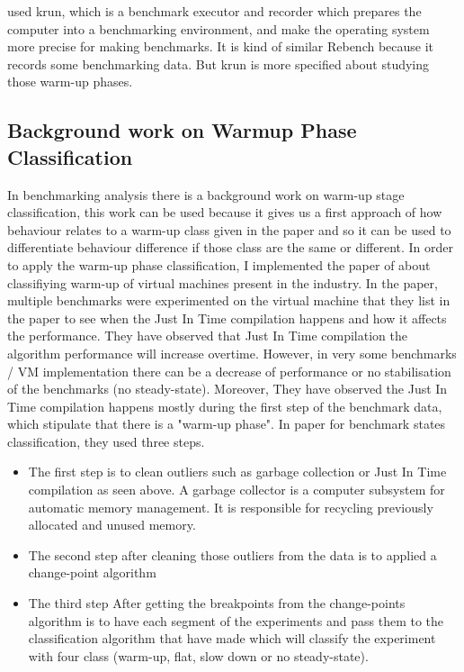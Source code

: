 \documentclass{article}
\begin{document}
\citep{barrett2017virtual} used krun, which is a benchmark executor and recorder which prepares the computer into a benchmarking environment, and make the operating system more precise for making benchmarks. It is kind of similar Rebench because it records some benchmarking data. But krun is more specified about studying those warm-up phases.

\subsection{Background work on Warmup Phase Classification}

In benchmarking analysis there is a background work on warm-up stage classification, this work can be used because it gives us a first approach of how behaviour relates to a warm-up class given in the paper and so it can be used to differentiate behaviour difference if those class are the same or different. In order to apply the warm-up phase classification, I implemented the paper of \citep{barrett2017virtual} about classifiying warm-up of virtual machines present in the industry. 
In the paper, multiple benchmarks were experimented on the virtual machine that they list in the paper to see when the Just In Time compilation happens and how it affects the performance.
They have observed that Just In Time compilation the algorithm performance will increase overtime. However, in very some benchmarks / VM implementation there can be a decrease of performance or no stabilisation of the benchmarks (no steady-state). Moreover, They have observed the Just In Time compilation happens mostly during the first step of the benchmark data, which stipulate that there is a "warm-up phase".
In \citep{barrett2017virtual} paper for benchmark states classification, they used three steps.

\begin{itemize}
    \item The first step is to clean outliers such as garbage collection or Just In Time compilation as seen above. A garbage collector is a computer subsystem for automatic memory management.  It is responsible for recycling previously allocated and unused memory.  
    \item The second step after cleaning those outliers from the data is to applied a change-point algorithm \citep{killick2014changepoint}
    \item The third step After getting the breakpoints from the change-points algorithm is to have each segment of the experiments and pass them to the classification algorithm that \citep{barrett2017virtual} have made which will classify the experiment with four class (warm-up, flat, slow down or no steady-state).
\end{itemize}
\end{document}

